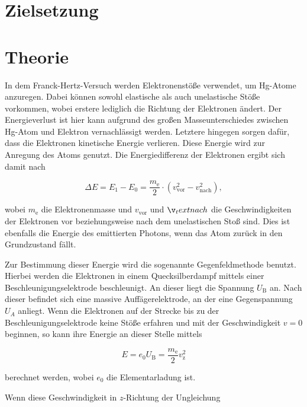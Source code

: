 \section{Zielsetzung}



\section{Theorie}
\label{sec:Theorie}

In dem Franck-Hertz-Versuch werden Elektronenstöße verwendet, um Hg-Atome anzuregen.
Dabei können sowohl elastische als auch unelastische Stöße vorkommen, wobei erstere lediglich die Richtung der Elektronen ändert. Der Energieverlust ist hier kann aufgrund des großen Masseunterschiedes zwischen Hg-Atom und Elektron vernachlässigt werden.
Letztere hingegen sorgen dafür, dass die Elektronen kinetische Energie verlieren. Diese Energie wird zur Anregung des Atoms genutzt.
Die Energiedifferenz der Elektronen ergibt sich damit nach

\begin{equation}
    \label{eqn:e-diff}
    \Delta E = E_1 - E_0 = \frac{m_\text{e}}{2} \cdot (v_\text{vor}^2 - v_\text{nach}^2),
\end{equation}

wobei $m_\text{e}$ die Elektronenmasse und $v_\text{vor}$ und $\v_text{nach}$ die Geschwindigkeiten der Elektronen vor beziehungsweise nach dem unelastischen Stoß sind.
Dies ist ebenfalls die Energie des emittierten Photons, wenn das Atom zurück in den Grundzustand fällt.

Zur Bestimmung dieser Energie wird die sogenannte Gegenfeldmethode benutzt.
Hierbei werden die Elektronen in einem Quecksilberdampf mittels einer Beschleunigungselektrode beschleunigt. An dieser liegt die Spannung $U_\text{B}$ an.
Nach dieser befindet sich eine massive Auffägerelektrode, an der eine Gegenspannung $U_A$ anliegt.
Wenn die Elektronen auf der Strecke bis zu der Beschleunigungselektrode keine Stöße erfahren und mit der Geschwindigkeit $v = 0$ beginnen, so kann ihre Energie an dieser Stelle mittels

\begin{equation}
    \label{eqn:eU}
    E = e_0 U_\text{B} = \frac{m_\text{e}}{2} v_\text{z}^2
\end{equation}

berechnet werden, wobei $e_0$ die Elementarladung ist.

Wenn diese Geschwindigkeit in $z$-Richtung der Ungleichung

